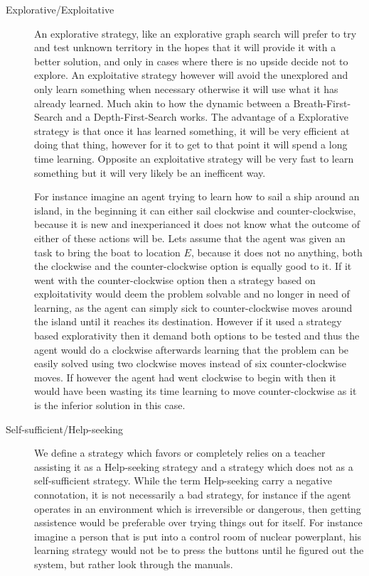 \documentclass[../Master.tex]{subfiles}
\begin{document}
    \begin{description}
    \item [{Explorative/Exploitative}] An explorative strategy, like an explorative graph search will prefer to try and test unknown territory in the hopes that it will provide it with a better solution, and only in cases where there is no upside decide not to explore.
    An exploitative strategy however will avoid the unexplored and only learn something when necessary otherwise it will use what it has already learned. Much akin to how the dynamic between a Breath-First-Search and a Depth-First-Search works. The advantage of a Explorative strategy is that once it has learned something, it will be very efficient at doing that thing, however for it to get to that point it will spend a long time learning. Opposite an exploitative strategy will be very fast to learn something but it will very likely be an inefficent way.

    For instance imagine an agent trying to learn how to sail a ship around an island, in the beginning it can either sail clockwise and counter-clockwise, because it is new and inexperianced it does not know what the outcome of either of these actions will be. Lets assume that the agent was given an task to bring the boat to location $ E $, because it does not no anything, both the clockwise and the counter-clockwise option is equally good to it. If it went with the counter-clockwise option then a strategy based on exploitativity would deem the problem solvable and no longer in need of learning, as the agent can simply sick to counter-clockwise moves around the island until it reaches its destination. However if it used a strategy based explorativity then it demand both options to be tested and thus the agent would do a clockwise afterwards learning that the problem can be easily solved using two clockwise moves instead of six counter-clockwise moves. If however the agent had went clockwise to begin with then it would have been wasting its time learning to move counter-clockwise as it is the inferior solution in this case.
    \item [{Self-sufficient/Help-seeking}] We define a strategy which favors
    or completely relies on a teacher assisting it as a Help-seeking strategy
    and a strategy which does not as a self-sufficient strategy. While
    the term Help-seeking carry a negative connotation, it is not necessarily
    a bad strategy, for instance if the agent operates in an environment
    which is irreversible or dangerous, then getting assistence would
    be preferable over trying things out for itself. For instance imagine
    a person that is put into a control room of nuclear powerplant, his
    learning strategy would not be to press the buttons until he figured
    out the system, but rather look through the manuals.

    \end{description}
\end{document}
